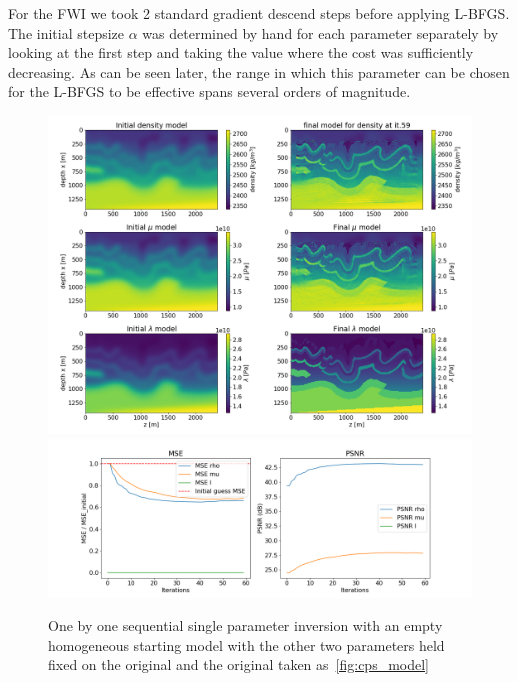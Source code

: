 \documentclass[10pt]{SelfArx} %
\theoremstyle{definition}
\begin{document}
For the FWI we took 2 standard gradient descend steps before applying L-BFGS. The initial stepsize $\alpha$ was determined by hand for each parameter separately by looking at the first step and taking the value where the cost was sufficiently decreasing. As can be seen later, the range in which this parameter can be chosen for the L-BFGS to be effective spans several orders of magnitude. 

\begin{figure}[!h]\label{fig:cps_fwi_empty_start_single_params}
\hspace*{-0.6in}
\includegraphics[width=1.20\textwidth]{fig/fwi_cps_single_param6s.png}
\hspace*{-0.6in}
\includegraphics[width=1.20\textwidth]{fig/fwi_cps_single_param6s_error.png}
\caption{One by one sequential single parameter inversion with an empty homogeneous starting model with the other two parameters held fixed on the original and the original taken as~\cref{fig:cps_model}}
\end{figure}
\end{document}
